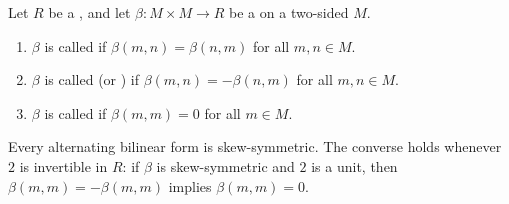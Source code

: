 \begin{definition} \label{definition:symmetric_skew_symmetric_alternating_bilinear_form_on_a_module_over_a_ring}
    Let $R$ be a , and let $\beta: M \times M \to R$ be a  on a two-sided  $M$.

    \begin{enumerate}
        \item $\beta$ is called  if $\beta(m, n) = \beta(n, m)$ for all $m, n \in M$.

        \item $\beta$ is called  (or ) if $\beta(m, n) = -\beta(n, m)$ for all $m, n \in M$.

        \item $\beta$ is called  if $\beta(m, m) = 0$ for all $m \in M$.
    \end{enumerate}

    Every alternating bilinear form is skew-symmetric. The converse holds whenever $2$ is invertible in $R$: if $\beta$ is skew-symmetric and $2$ is a unit, then $\beta(m,m) = -\beta(m,m)$ implies $\beta(m,m) = 0$.
\end{definition}
